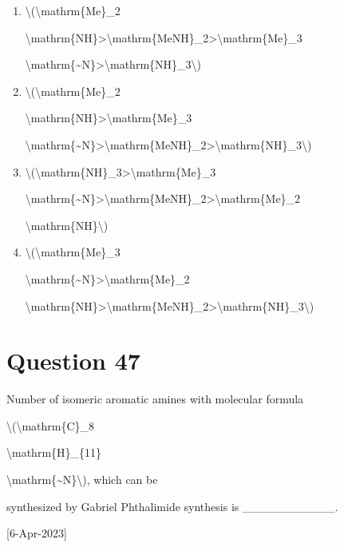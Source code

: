 \documentclass{article}
\begin{document}
\begin{enumerate}[label=(\alph*)]
\item \textbackslash(\textbackslash mathrm\{Me\}\_2

\textbackslash mathrm\{NH\}\textgreater\textbackslash mathrm\{MeNH\}\_2\textgreater\textbackslash mathrm\{Me\}\_3

\textbackslash mathrm\{\textasciitilde N\}\textgreater\textbackslash mathrm\{NH\}\_3\textbackslash)


\item \textbackslash(\textbackslash mathrm\{Me\}\_2

\textbackslash mathrm\{NH\}\textgreater\textbackslash mathrm\{Me\}\_3

\textbackslash mathrm\{\textasciitilde N\}\textgreater\textbackslash mathrm\{MeNH\}\_2\textgreater\textbackslash mathrm\{NH\}\_3\textbackslash)


\item \textbackslash(\textbackslash mathrm\{NH\}\_3\textgreater\textbackslash mathrm\{Me\}\_3

\textbackslash mathrm\{\textasciitilde N\}\textgreater\textbackslash mathrm\{MeNH\}\_2\textgreater\textbackslash mathrm\{Me\}\_2

\textbackslash mathrm\{NH\}\textbackslash)


\item \textbackslash(\textbackslash mathrm\{Me\}\_3

\textbackslash mathrm\{\textasciitilde N\}\textgreater\textbackslash mathrm\{Me\}\_2

\textbackslash mathrm\{NH\}\textgreater\textbackslash mathrm\{MeNH\}\_2\textgreater\textbackslash mathrm\{NH\}\_3\textbackslash)


\end{enumerate}
\newpage
\section*{Question 47}
Number of isomeric aromatic amines with molecular formula

\textbackslash(\textbackslash mathrm\{C\}\_8

\textbackslash mathrm\{H\}\_\{11\}

\textbackslash mathrm\{\textasciitilde N\}\textbackslash), which can be

synthesized by Gabriel Phthalimide synthesis is \_\_\_\_\_\_\_\_\_\_\_.~

{[}6-Apr-2023{]}


\begin{enumerate}[label=(\alph*)]
\end{enumerate}
\newpage
\end{document}
